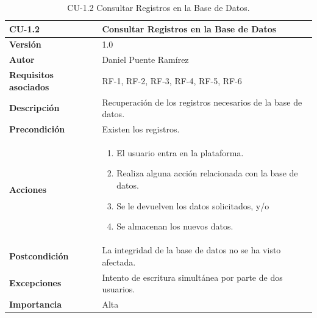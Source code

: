 \begin{table}[p]
\centering
\begin{tabularx}{\linewidth}{ p{} p{} }
\toprule
\textbf{CU-1.2} & \textbf{Consultar Registros en la Base de Datos}\\
\toprule
\textbf{Versión} & 1.0\\
\textbf{Autor} & Daniel Puente Ramírez\\
\textbf{Requisitos asociados} & RF-1, RF-2, RF-3, RF-4, RF-5, RF-6\\
\textbf{Descripción} & Recuperación de los registros necesarios de la base de datos.\\
\textbf{Precondición} & Existen los registros.\\
\textbf{Acciones} &
\begin{enumerate}
\def\labelenumi{\arabic{enumi}.}
\tightlist
\item El usuario entra en la plataforma.
\item Realiza alguna acción relacionada con la base de datos.
\item Se le devuelven los datos solicitados, y/o
\item Se almacenan los nuevos datos.
\end{enumerate}\\
\textbf{Postcondición} & La integridad de la base de datos no se ha visto afectada.\\
\textbf{Excepciones} & Intento de escritura simultánea por parte de dos usuarios.\\
\textbf{Importancia} & Alta \\
\bottomrule
\end{tabularx}
\caption{CU-1.2 Consultar Registros en la Base de Datos.}
\end{table}

